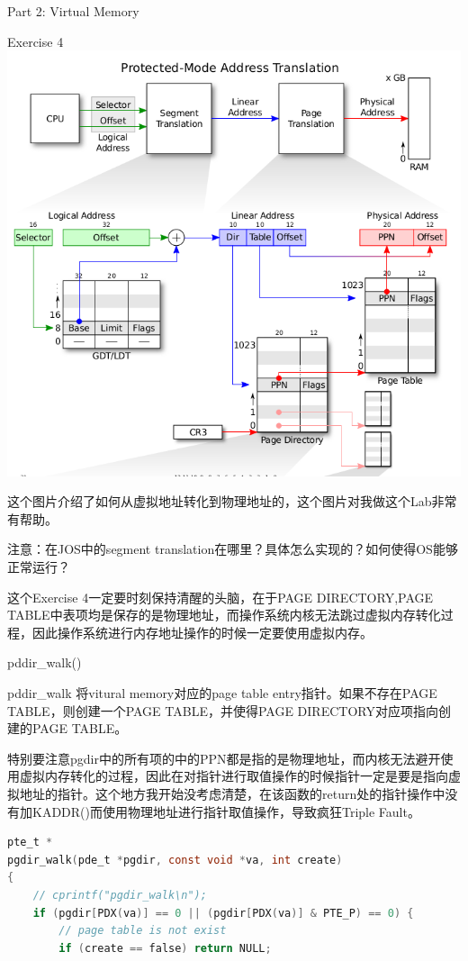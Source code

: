 \documentclass[GBK,winfonts,a4paper,10pt]{ctexart}
\begin{document}
\begin{section}{Part 2: Virtual Memory}
\begin{subsection}{Exercise 4}
\includegraphics[scale=0.5]{LogicalAddrToPhysicAddr.png}
\par
这个图片介绍了如何从虚拟地址转化到物理地址的，这个图片对我做这个Lab非常有帮助。
\par
注意：在JOS中的segment translation在哪里？具体怎么实现的？如何使得OS能够正常运行？
\par
这个Exercise 4一定要时刻保持清醒的头脑，在于PAGE DIRECTORY,PAGE TABLE中表项均是保存的是物理地址，而操作系统内核无法跳过虚拟内存转化过程，因此操作系统进行内存地址操作的时候一定要使用虚拟内存。
\begin{subsubsection}{pddir\_walk()}
\par
pddir\_walk 将vitural memory对应的page table entry指针。如果不存在PAGE TABLE，则创建一个PAGE TABLE，并使得PAGE DIRECTORY对应项指向创建的PAGE TABLE。
\par
特别要注意pgdir中的所有项的中的PPN都是指的是物理地址，而内核无法避开使用虚拟内存转化的过程，因此在对指针进行取值操作的时候指针一定是要是指向虚拟地址的指针。这个地方我开始没考虑清楚，在该函数的return处的指针操作中没有加KADDR()而使用物理地址进行指针取值操作，导致疯狂Triple Fault。
\begin{lstlisting}[language=C]
pte_t *
pgdir_walk(pde_t *pgdir, const void *va, int create)
{
    // cprintf("pgdir_walk\n");
    if (pgdir[PDX(va)] == 0 || (pgdir[PDX(va)] & PTE_P) == 0) {
        // page table is not exist
        if (create == false) return NULL;


\end{lstlisting}
\end{subsubsection}
\end{subsection}
\end{section}
\end{document}

